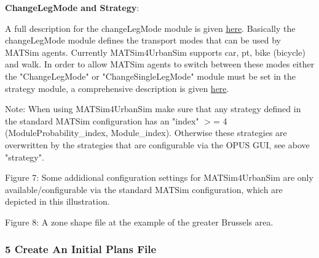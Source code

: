 
\textbf{ChangeLegMode and Strategy}:

A full description for the changeLegMode module is given \href{http://www.matsim.org/node/387}{here}.  Basically the changeLegMode module defines the transport modes that can  be used by MATSim agents. Currently MATSim4UrbanSim supports car, pt,  bike (bicycle) and walk. In order to allow MATSim agents to switch  between these modes either the "ChangeLegMode" or "ChangeSingleLegMode"  module must be set in the strategy module, a comprehensive description  is given \href{http://www.matsim.org/node/617}{here}.

Note: When using MATSim4UrbanSim  make sure that any strategy defined in the standard MATSim  configuration has an "index" $>$= 4 (ModuleProbability\_index,  Module\_index). Otherwise these strategies are overwritten by the  strategies that are configurable via the OPUS GUI, see above "strategy".



Figure 7: Some addidional configuration settings for MATSim4UrbanSim  are only available/configurable via the standard MATSim configuration,  which are depicted in this illustration.



Figure 8: A zone shape file at the example of the greater Brussels area.

\subsubsection{5 Create An Initial Plans File}

